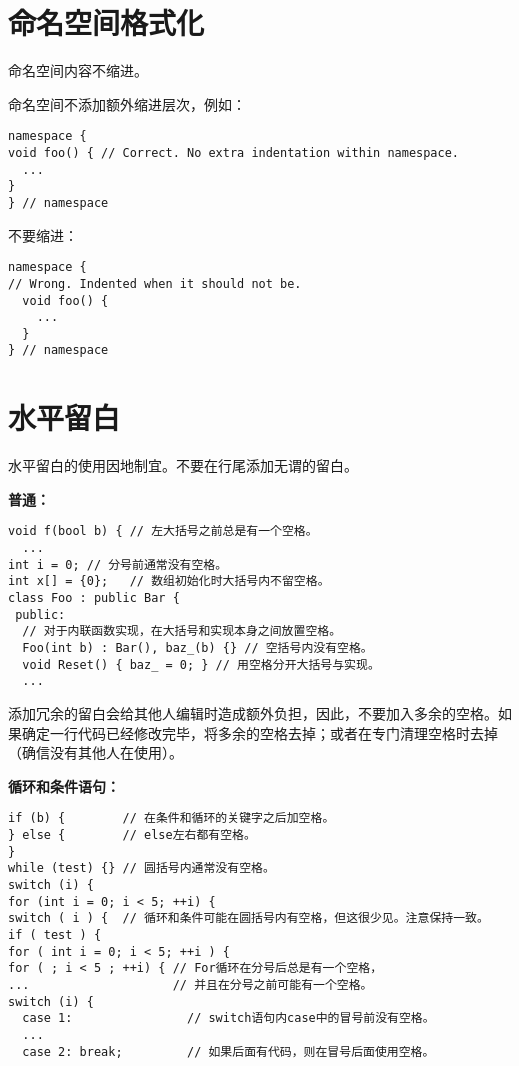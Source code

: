 \section{命名空间格式化}
命名空间内容不缩进。

命名空间不添加额外缩进层次，例如：
\begin{verbatim}
namespace {
void foo() { // Correct. No extra indentation within namespace.
  ...
}
} // namespace
\end{verbatim}
不要缩进：
\begin{verbatim}
namespace {
// Wrong. Indented when it should not be.
  void foo() {
    ...
  }
} // namespace
\end{verbatim}


\section{水平留白}
水平留白的使用因地制宜。不要在行尾添加无谓的留白。

\textbf{普通：}
\begin{verbatim}
void f(bool b) { // 左大括号之前总是有一个空格。
  ...
int i = 0; // 分号前通常没有空格。
int x[] = {0};   // 数组初始化时大括号内不留空格。
class Foo : public Bar {
 public:
  // 对于内联函数实现，在大括号和实现本身之间放置空格。
  Foo(int b) : Bar(), baz_(b) {} // 空括号内没有空格。
  void Reset() { baz_ = 0; } // 用空格分开大括号与实现。
  ...
\end{verbatim}

添加冗余的留白会给其他人编辑时造成额外负担，因此，不要加入多余的空格。如果确定一行代码已经修改完毕，将多余的空格去掉；或者在专门清理空格时去掉（确信没有其他人在使用）。

\textbf{循环和条件语句：}
\begin{verbatim}
if (b) {        // 在条件和循环的关键字之后加空格。
} else {        // else左右都有空格。
}
while (test) {} // 圆括号内通常没有空格。
switch (i) {
for (int i = 0; i < 5; ++i) {
switch ( i ) {  // 循环和条件可能在圆括号内有空格，但这很少见。注意保持一致。
if ( test ) {
for ( int i = 0; i < 5; ++i ) {
for ( ; i < 5 ; ++i) { // For循环在分号后总是有一个空格，
...                    // 并且在分号之前可能有一个空格。
switch (i) {
  case 1:                // switch语句内case中的冒号前没有空格。
  ...
  case 2: break;         // 如果后面有代码，则在冒号后面使用空格。
\end{verbatim}


